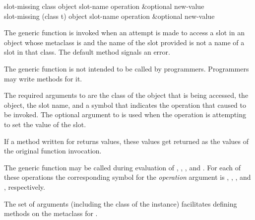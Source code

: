 \begin{defun}
slot-missing class object slot-name operation &optional new-value \\
slot-missing (class t) object slot-name operation &optional new-value

The generic function  is invoked when an attempt is
made to access a slot in an object whose metaclass is 
 and the name of the slot provided is not a name of a
slot in that class.  
The default method signals an error.

The generic function  is not intended to be called by
programmers.  Programmers may write methods for it.





The required arguments to  are the class of the object
that is being accessed, the object, the slot name, and a symbol that
indicates the operation that caused   to be invoked.
The optional argument to  is used when the operation
is attempting to set the value of the slot.


If a method written for  returns values, these
values get returned as the values of the original function invocation.


The generic function  may be called during
evaluation of , , 
, and .  For each
of these operations the corresponding symbol for the \emph{operation\/}
argument is , , , and 
, respectively.

The set of arguments (including the class of the instance) facilitates
defining methods on the metaclass for .

\end{defun}


